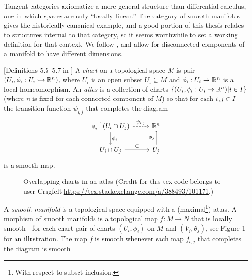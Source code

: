 Tangent categories axiomatize a more general structure than differential calculus, one in which spaces are only ``locally linear.''
The category of smooth manifolds gives the historically canonical example, and a good portion of this thesis relates to structures internal to that category,
so it seems worthwhile to set a working definition for that context.
We follow \cite{Tu2011}, and allow for disconnected components of a manifold to have different dimensions.

\begin{definition}%
\label{def:smooth-manifold}[Definitions 5.5--5.7 in \cite{Tu2011}]
    A \emph{chart} on a topological space $M$ is pair $(U_i, \phi_i:U_i \hookrightarrow \mathbb{R}^n)$, where $U_i$ is an open subset $U_i \subseteq M$ and $\phi_i:U_i \to \mathbb{R}^n$ is a local homeomorphism.
    An \emph{atlas} is a collection of charts $\{ (U_i,\phi_i:U_i \to \mathbb{R}^n) | i \in I \}$ (where $n$ is fixed for each connected component of $M$) so that for each $i,j \in I$, the transition function $\psi_{i,j}$ that completes the diagram
    \[\begin{tikzcd}
        {\phi_{i}^{-1}(U_{i} \cap U_j)} & {\R^n} \\
        {U_{i} \cap U_j} & {U_j}
        \arrow["{\phi_i}", from=1-1, to=2-1]
        \arrow["\subseteq", from=2-1, to=2-2]
        \arrow["{\phi_j}", from=2-2, to=1-2]
        \arrow["{\psi_{i,j}}", dashed, from=1-1, to=1-2]
    \end{tikzcd}\]
    is a smooth map.
    \begin{figure}
        \centering
             
        \caption{Overlapping charts in an atlas (Credit for this tex code belongs to user Cragfelt \url{https://tex.stackexchange.com/a/388493/101171}.)}
        \label{fig:overlapping-charts}
    \end{figure}
    A \emph{smooth manifold} is a topological space equipped with a (maximal\footnote{With respect to subset inclusion.}) atlas.  A morphism of smooth manifolds is a topological map $f: M \to N$ that is locally smooth - for each chart pair of charts $(U_i, \phi_i)$ on $M$ and $(V_j, \theta_j)$, see Figure \ref{fig:overlapping-charts} for an illustration. The map $f$ is smooth whenever each map $f_{i,j}$ that completes the diagram is smooth 

\end{definition}
